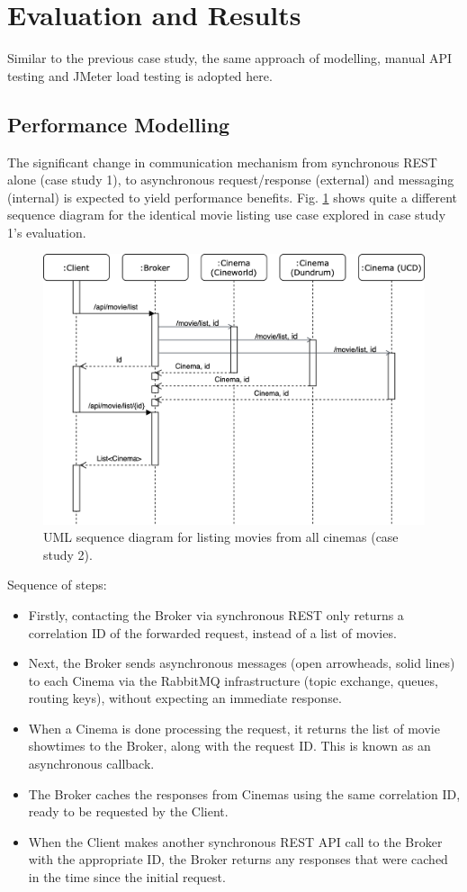 \section{Evaluation and Results}

Similar to the previous case study, the same approach of modelling, manual API testing and JMeter load testing is adopted here.

\subsection{Performance Modelling}

The significant change in communication mechanism from synchronous REST alone (case study 1), to asynchronous request/response (external) and messaging (internal) is expected to yield performance benefits. Fig. \ref{fig:cs02-sequence} shows quite a different sequence diagram for the identical movie listing use case explored in case study 1's evaluation.

\begin{figure}[H]
  \centering
  \includegraphics[width=0.75\linewidth]{./assets/diagrams/cs02-sequence.png}
  \caption{UML sequence diagram for listing movies from all cinemas (case study 2).}
  \label{fig:cs02-sequence}
\end{figure}

Sequence of steps:
\begin{itemize}
  \item Firstly, contacting the Broker via synchronous REST only returns a correlation ID of the forwarded request, instead of a list of movies.
  \item Next, the Broker sends asynchronous messages (open arrowheads, solid lines) to each Cinema via the RabbitMQ infrastructure (topic exchange, queues, routing keys), without expecting an immediate response.
  \item When a Cinema is done processing the request, it returns the list of movie showtimes to the Broker, along with the request ID. This is known as an asynchronous callback.
  \item The Broker caches the responses from Cinemas using the same correlation ID, ready to be requested by the Client.
  \item When the Client makes another synchronous REST API call to the Broker with the appropriate ID, the Broker returns any responses that were cached in the time since the initial request.
\end{itemize}

